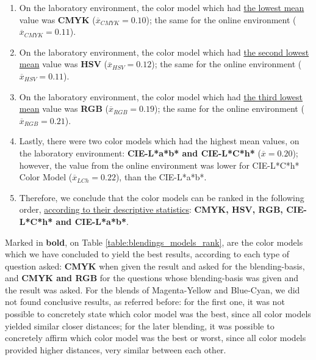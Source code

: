 \begin{enumerate}
  \item On the laboratory environment, the color model which had \ul{the lowest mean} value was \textbf{CMYK} ($\overline{x}_{CMYK} = 0.10$); the same for the online environment ($\overline{x}_{CMYK} = 0.11$).
  \item On the laboratory environment, the color model which had \ul{the second lowest mean} value was \textbf{HSV} ($\overline{x}_{HSV} = 0.12$); the same for the online environment ($\overline{x}_{HSV} = 0.11$).
  \item On the laboratory environment, the color model which had \ul{the third lowest mean} value was \textbf{RGB} ($\overline{x}_{RGB} = 0.19$); the same for the online environment ($\overline{x}_{RGB} = 0.21$).
  \item Lastly, there were two color models which had the highest mean values, on the laboratory environment: \textbf{CIE-L*a*b* and CIE-L*C*h*} ($\overline{x} = 0.20$); however, the value from the online environment
  was lower for CIE-L*C*h* Color Model ($\overline{x}_{LCh} = 0.22$), than the CIE-L*a*b*.
  \item Therefore, we conclude that the color models can be ranked in the following order, \ul{according to their descriptive statistics}: \textbf{CMYK, HSV, RGB, CIE-L*C*h* and CIE-L*a*b*}.
\end{enumerate}
%
Marked in \textbf{bold}, on Table \ref{table:blendings_models_rank}, are the color models which we have concluded to yield the best results, according to each type of question asked: \textbf{CMYK} when given the
result and asked for the blending-basis, and \textbf{CMYK and RGB} for the questions whose blending-basis was given and the result was asked. For the blends of Magenta-Yellow and Blue-Cyan, we did not found
conclusive results, as referred before: for the first one, it was not possible to concretely state which color model was the best, since all color models yielded similar closer distances; for the later blending, it was possible
to concretely affirm which color model was the best or worst, since all color models provided higher distances, very similar between each other.
%
